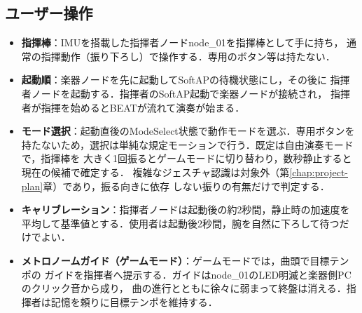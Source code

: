 \documentclass[lualatex,book,paper=a4paper,jafontsize=11.5pt,jafontscale=1.05]{jlreq}
\begin{document}
\subsection{ユーザー操作}
\begin{itemize}[leftmargin=1.4em, itemsep=2pt]
  \item \textbf{指揮棒}：IMUを搭載した指揮者ノードnode\_01を指揮棒として手に持ち，
        通常の指揮動作（振り下ろし）で操作する．専用のボタン等は持たない．
  \item \textbf{起動順}：楽器ノードを先に起動してSoftAPの待機状態にし，その後に
        指揮者ノードを起動する．指揮者のSoftAP起動で楽器ノードが接続され，
        指揮者が指揮を始めるとBEATが流れて演奏が始まる．
  \item \textbf{モード選択}：起動直後のModeSelect状態で動作モードを選ぶ．専用ボタンを
        持たないため，選択は単純な規定モーションで行う．既定は自由演奏モードで，指揮棒を
        大きく1回振るとゲームモードに切り替わり，数秒静止すると現在の候補で確定する．
        複雑なジェスチャ認識は対象外（第\ref{chap:project-plan}章）であり，振る向きに依存
        しない振りの有無だけで判定する．
  \item \textbf{キャリブレーション}：指揮者ノードは起動後の約2秒間，静止時の加速度を
        平均して基準値とする．使用者は起動後2秒間，腕を自然に下ろして待つだけでよい．
  \item \textbf{メトロノームガイド（ゲームモード）}：ゲームモードでは，曲頭で目標テンポの
        ガイドを指揮者へ提示する．ガイドはnode\_01のLED明滅と楽器側PCのクリック音から成り，
        曲の進行とともに徐々に弱まって終盤は消える．指揮者は記憶を頼りに目標テンポを維持する．
\end{itemize}
\end{document}
